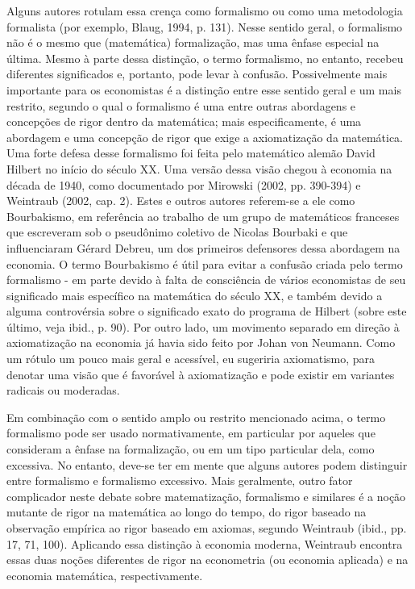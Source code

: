 \documentclass[12pt]{article}
\begin{document}
Alguns autores rotulam essa crença como formalismo ou como uma metodologia formalista (por exemplo, Blaug, 1994, p. 131). Nesse sentido geral, o formalismo não é o mesmo que (matemática) formalização, mas uma ênfase especial na última. Mesmo à parte dessa distinção, o termo formalismo, no entanto, recebeu diferentes significados e, portanto, pode levar à confusão. Possivelmente mais importante para os economistas é a distinção entre esse sentido geral e um mais restrito, segundo o qual o formalismo é uma entre outras abordagens e concepções de rigor dentro da matemática; mais especificamente, é uma abordagem e uma concepção de rigor que exige a axiomatização da matemática. Uma forte defesa desse formalismo foi feita pelo matemático alemão David Hilbert no início do século XX. Uma versão dessa visão chegou à economia na década de 1940, como documentado por Mirowski (2002, pp. 390-394) e Weintraub (2002, cap. 2). Estes e outros autores referem-se a ele como Bourbakismo, em referência ao trabalho de um grupo de matemáticos franceses que escreveram sob o pseudônimo coletivo de Nicolas Bourbaki e que influenciaram Gérard Debreu, um dos primeiros defensores dessa abordagem na economia. O termo Bourbakismo é útil para evitar a confusão criada pelo termo formalismo - em parte devido à falta de consciência de vários economistas de seu significado mais específico na matemática do século XX, e também devido a alguma controvérsia sobre o significado exato do programa de Hilbert (sobre este último, veja ibid., p. 90). Por outro lado, um movimento separado em direção à axiomatização na economia já havia sido feito por Johan von Neumann. Como um rótulo um pouco mais geral e acessível, eu sugeriria axiomatismo, para denotar uma visão que é favorável à axiomatização e pode existir em variantes radicais ou moderadas.

Em combinação com o sentido amplo ou restrito mencionado acima, o termo formalismo pode ser usado normativamente, em particular por aqueles que consideram a ênfase na formalização, ou em um tipo particular dela, como excessiva. No entanto, deve-se ter em mente que alguns autores podem distinguir entre formalismo e formalismo excessivo. Mais geralmente, outro fator complicador neste debate sobre matematização, formalismo e similares é a noção mutante de rigor na matemática ao longo do tempo, do rigor baseado na observação empírica ao rigor baseado em axiomas, segundo Weintraub (ibid., pp. 17, 71, 100). Aplicando essa distinção à economia moderna, Weintraub encontra essas duas noções diferentes de rigor na econometria (ou economia aplicada) e na economia matemática, respectivamente.
\end{document}
